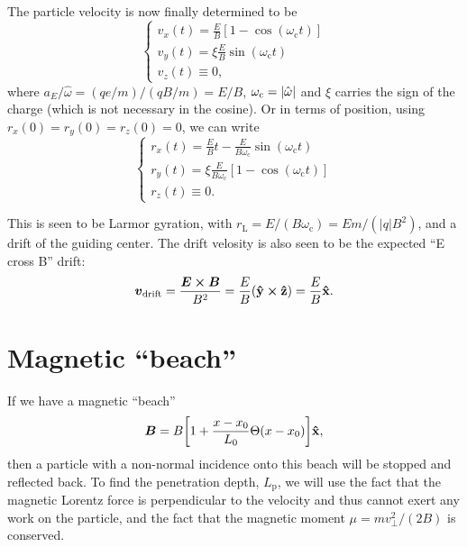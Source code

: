 \documentclass[11pt,a4paper, 
swedish, english %
]{article}
\newcommand{\wc}{\ensuremath{\omega_{\text{c}}}}
\newcommand{\rL}{\ensuremath{r_{\text{L}}}}
\begin{document}
The particle velocity is now finally determined to be
\begin{equation}
\begin{cases}
v_x(t) = \frac{E}{B}[1-\cos(\wc t)]\\
v_y(t) = \xi\frac{E}{B}\sin(\wc t)\\
v_z(t) \equiv 0,
\end{cases}
\end{equation}
where $a_E/\hat\omega = (qe/m)/(qB/m)=E/B$, $\wc=\abs{\hat\omega}$ and
$\xi$ carries the sign of the charge (which is not necessary in the
cosine). Or in terms of position, using $r_x(0)=r_y(0)=r_z(0)=0$, we
can write
\begin{equation}
\begin{cases}
r_x(t) = \frac{E}{B}t-\frac{E}{B\wc}\sin(\wc t)\\
r_y(t) = \xi\frac{E}{B\wc}[1-\cos(\wc t)]\\
r_z(t) \equiv 0.
\end{cases}
\end{equation}

This is seen to be Larmor gyration, with $\rL=E/(B\wc)=Em/(|q|B^2)$,
and a drift of the guiding center. The drift velosity is also seen to
be the expected\footnotemark{} ``E cross B'' drift:
\begin{equation}
\vb*v_\text{drift} = \frac{\vb*E\cross\vb*B}{B^2}
=\frac{E}{B} (\vu{y}\cross\vu{z})
=\frac{E}{B} \vu{x}.
\end{equation}


\section{Magnetic ``beach''}
\newcommand{\Lp}{\ensuremath{L_{\text{p}}}}
If we have a magnetic ``beach''
\begin{equation}
\vb*B = B\qty[1+\frac{x-x_0}{L_0}\Theta(x-x_0)]\vu{x},
\end{equation}
then a particle with a non-normal incidence onto this beach will be
stopped and reflected back. To find the penetration depth, \Lp, we
will use the fact that the magnetic Lorentz force is perpendicular to
the velocity and thus cannot exert any work on the particle, and the
fact that the magnetic moment $\mu=m v_\perp^2/(2B)$ is conserved.
\end{document}
